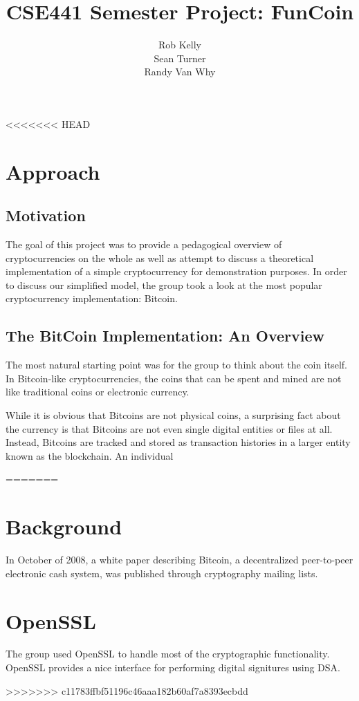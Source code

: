 \documentclass[12pt]{article}
\begin{document}
\title{CSE441 Semester Project: FunCoin}
\author{Rob Kelly\\Sean Turner\\Randy Van Why}
\maketitle

<<<<<<< HEAD
\section{Approach}
\subsection{Motivation}
The goal of this project was to provide a pedagogical overview of cryptocurrencies on the whole
as well as attempt to discuss a theoretical implementation of a simple cryptocurrency for
demonstration purposes. In order to discuss our simplified model, the group took a look at
the most popular cryptocurrency implementation: Bitcoin.

\subsection{The BitCoin Implementation: An Overview}
The most natural starting point was for the group to think about the coin itself.
In Bitcoin-like cryptocurrencies, the coins that can be spent and mined are not
like traditional coins or electronic currency.

While it is obvious that Bitcoins are not physical coins, a surprising fact about
the currency is that Bitcoins are not even single digital entities or files at all.
Instead, Bitcoins are tracked and stored as transaction histories in a larger entity
known as the blockchain. An individual 

=======
\section{Background}
In October of 2008, a white paper\cite{nakamoto:bitcoin} describing Bitcoin, a decentralized peer-to-peer electronic cash system, was published through cryptography mailing lists.

\section{OpenSSL}
The group used OpenSSL to handle most of the cryptographic functionality. OpenSSL provides a nice interface for performing digital signitures using DSA.



>>>>>>> c11783ffbf51196c46aaa182b60af7a8393ecbdd
\end{document}
